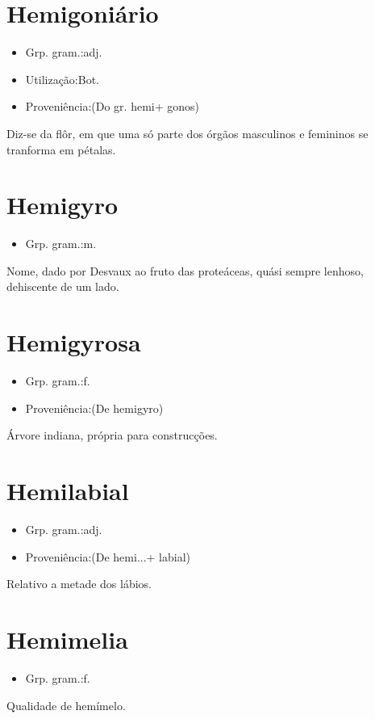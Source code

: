 \documentclass{article}
\begin{document}
\section{Hemigoniário}
\begin{itemize}
\item {Grp. gram.:adj.}
\end{itemize}
\begin{itemize}
\item {Utilização:Bot.}
\end{itemize}
\begin{itemize}
\item {Proveniência:(Do gr. \textunderscore hemi\textunderscore  + \textunderscore gonos\textunderscore )}
\end{itemize}
Diz-se da flôr, em que uma só parte dos órgãos masculinos e femininos se tranforma em pétalas.
\section{Hemigyro}
\begin{itemize}
\item {Grp. gram.:m.}
\end{itemize}
Nome, dado por Desvaux ao fruto das proteáceas, quási sempre lenhoso, dehiscente de um lado.
\section{Hemigyrosa}
\begin{itemize}
\item {Grp. gram.:f.}
\end{itemize}
\begin{itemize}
\item {Proveniência:(De \textunderscore hemigyro\textunderscore )}
\end{itemize}
Árvore indiana, própria para construcções.
\section{Hemilabial}
\begin{itemize}
\item {Grp. gram.:adj.}
\end{itemize}
\begin{itemize}
\item {Proveniência:(De \textunderscore hemi...\textunderscore  + \textunderscore labial\textunderscore )}
\end{itemize}
Relativo a metade dos lábios.
\section{Hemimelia}
\begin{itemize}
\item {Grp. gram.:f.}
\end{itemize}
Qualidade de hemímelo.
\end{document}
